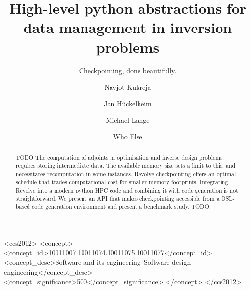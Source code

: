 \documentclass[sigconf]{acmart}
\begin{document}
\title{High-level python abstractions for data management in inversion problems}
\subtitle{Checkpointing, done beautifully.}


\author{Navjot Kukreja}
\author{Jan H\"uckelheim}
\author{Michael Lange}
\author{Who Else}

\renewcommand\shortauthors{Kukreja, N. et al}

\begin{abstract} TODO
The computation of adjoints in optimisation and inverse design problems requires storing intermediate data. The available memory size sets a limit to this, and necessitates recomputation in some instances. Revolve checkpointing offers an optimal schedule that trades computational cost for smaller memory footprints. Integrating Revolve into a modern python HPC code and combining it with code generation is not straightforward. We present an API that makes checkpointing accessible from a DSL-based code generation environment and present a benchmark study. TODO.
\end{abstract}

%
%
\begin{CCSXML}
<ccs2012>
<concept>
<concept_id>10011007.10011074.10011075.10011077</concept_id>
<concept_desc>Software and its engineering~Software design engineering</concept_desc>
<concept_significance>500</concept_significance>
</concept>
</ccs2012>
\end{CCSXML}

%
%


\end{document}
